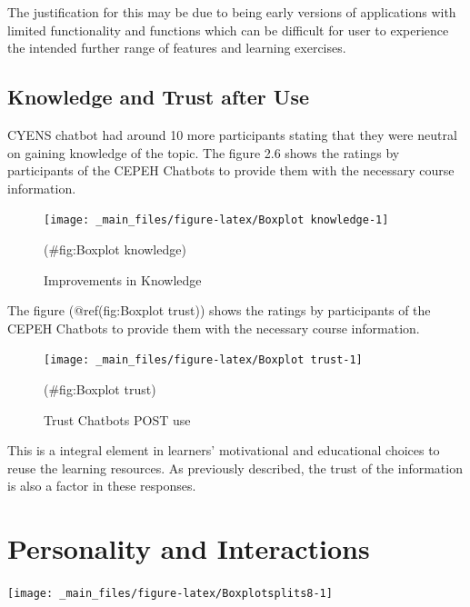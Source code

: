 \documentclass[a4paper, nobind]{templates/ociamthesis}
\begin{document}
The justification for this may be due to being early versions of applications with limited functionality and functions which can be difficult for user to experience the intended further range of features and learning exercises.

\hypertarget{knowledge-and-trust-after-use}{%
\subsection{Knowledge and Trust after Use}\label{knowledge-and-trust-after-use}}

CYENS chatbot had around 10 more participants stating that they were neutral on gaining knowledge of the topic. The ﬁgure 2.6 shows the ratings by participants of the CEPEH Chatbots to provide them with the necessary course information.

\begin{figure}

{\centering \texttt{[image: \_main\_files/figure-latex/Boxplot knowledge-1]} 

}

\caption{Improvements in Knowledge}(\#fig:Boxplot knowledge)
\end{figure}

The figure (@ref(fig:Boxplot trust)) shows the ratings by participants of the CEPEH Chatbots to provide them with the necessary course information.

\begin{figure}

{\centering \texttt{[image: \_main\_files/figure-latex/Boxplot trust-1]} 

}

\caption{Trust Chatbots POST use}(\#fig:Boxplot trust)
\end{figure}

This is a integral element in learners' motivational and educational choices to reuse the learning resources. As previously described, the trust of the information is also a factor in these responses.

\hypertarget{personality-and-interactions}{%
\section{Personality and Interactions}\label{personality-and-interactions}}

\begin{center}\texttt{[image: \_main\_files/figure-latex/Boxplotsplits8-1]} \end{center}
\end{document}
